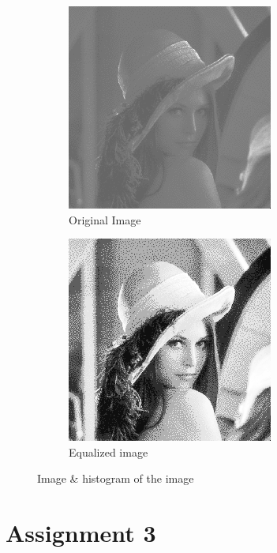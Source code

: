 \documentclass[a4paper,16pt]{article}
\begin{document}
	\begin{figure}[h!]
		\begin{subfigure}[h]{0.6\linewidth}
			\includegraphics[scale=1]{Lenna}
			\caption{Original Image}
		\end{subfigure}
		\begin{subfigure}[h]{0.6\linewidth}
			\includegraphics[scale=0.76]{myGray}
			\caption{Equalized image}
		\end{subfigure}%
		\caption{Image \& histogram of the image}
	\end{figure}
	\section{Assignment 3}
\end{document}
